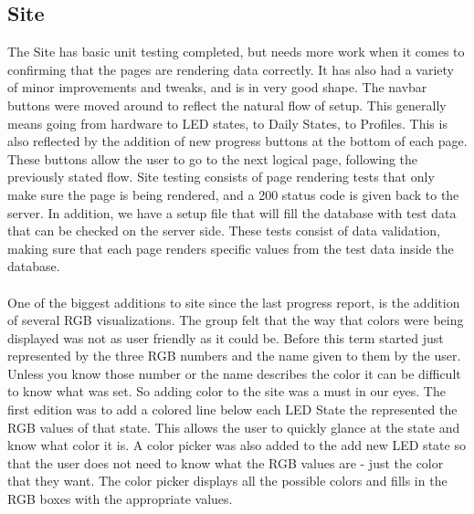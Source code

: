 \documentclass[onecolumn, draftclsnofoot,10pt, compsoc]{IEEEtran}
\begin{document}
	\subsection{Site}
		\noindent The Site has basic unit testing completed, but needs more work when it comes to confirming that the pages are rendering data correctly.
		It has also had a variety of minor improvements and tweaks, and is in very good shape. The navbar buttons were moved around to reflect the natural
		flow of setup. This generally means going from hardware to LED states, to Daily States, to Profiles. This is also reflected by the addition of new
		progress buttons at the bottom of each page. These buttons allow the user to go to the next logical page, following the previously stated flow.
		Site testing consists of page rendering tests that only make sure the page is being rendered, and a 200 status code is given back to the server.
		In addition, we have a setup file that will fill the database with test data that can be checked on the server side. These tests consist of data
		validation, making sure that each page renders specific values from the test data inside the database.
	  	\\\\
		\noindent One of the biggest additions to site since the last progress report, is the addition of several RGB visualizations. The group felt that the 
		way that colors were being displayed was not as user friendly as it could be. Before this term started just represented by the three RGB numbers and 
		the name given to them by the user. Unless you know those number or the name describes the color it can be difficult to know what was set. So adding 
		color to the site was a must in our eyes. The first edition was to add a colored line below each LED State the represented the RGB values of that 
		state. This allows the user to quickly glance at the state and know what color it is. A color picker was also added to the add new LED state so that 
		the user does not need to know what the RGB values are - just the color that they want. The color picker displays all the possible colors and fills in 
		the RGB boxes with the appropriate values.
\end{document}
